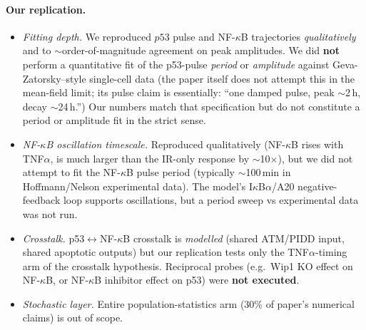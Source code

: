 \documentclass[11pt]{article}
\begin{document}
\paragraph{Our replication.}
\begin{itemize}
  \item \emph{Fitting depth.} We reproduced $p53$ pulse and NF-$\kappa$B
        trajectories \emph{qualitatively} and to $\sim$order-of-magnitude
        agreement on peak amplitudes. We did \textbf{not} perform a
        quantitative fit of the p53-pulse \emph{period} or \emph{amplitude}
        against Geva-Zatorsky--style single-cell data (the paper itself does
        not attempt this in the mean-field limit; its pulse claim is
        essentially: ``one damped pulse, peak $\sim$2\,h, decay $\sim$24\,h.'')
        Our numbers match that specification but do not constitute a period
        or amplitude fit in the strict sense.
  \item \emph{NF-$\kappa$B oscillation timescale.} Reproduced qualitatively
        (NF-$\kappa$B rises with TNF$\alpha$, is much larger than the IR-only
        response by $\sim$10$\times$), but we did not attempt to fit the
        NF-$\kappa$B pulse period (typically $\sim$100\,min in Hoffmann/Nelson
        experimental data). The model's I$\kappa$B$\alpha$/A20 negative-feedback
        loop supports oscillations, but a period sweep vs experimental data was
        not run.
  \item \emph{Crosstalk.} p53$\leftrightarrow$NF-$\kappa$B crosstalk is
        \emph{modelled} (shared ATM/PIDD input, shared apoptotic outputs) but
        our replication tests only the TNF$\alpha$-timing arm of the crosstalk
        hypothesis. Reciprocal probes (e.g.\ Wip1 KO effect on NF-$\kappa$B, or
        NF-$\kappa$B inhibitor effect on p53) were \textbf{not executed}.
  \item \emph{Stochastic layer.} Entire population-statistics arm (30\% of
        paper's numerical claims) is out of scope.
\end{itemize}
\end{document}

